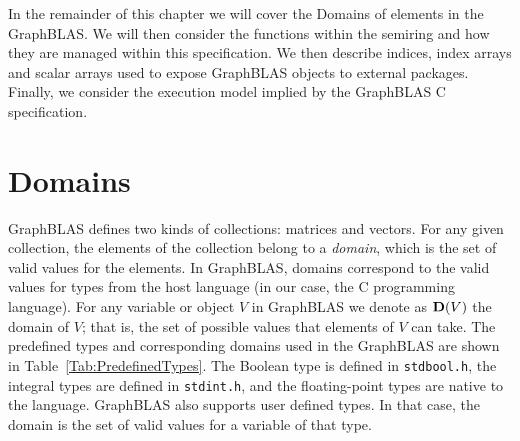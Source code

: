 In the remainder of this chapter we will cover the Domains of 
elements in the GraphBLAS.  We will then consider the functions
within the semiring and how they are managed within this specification.
We then describe indices, index arrays and scalar arrays used
to expose GraphBLAS objects to external packages.  Finally, we consider 
the execution model implied by the GraphBLAS C specification.

\section{Domains}

GraphBLAS defines two kinds of collections: matrices and vectors.
For any given collection, the elements of the collection belong to
a \emph{domain}, which is the set of valid values for the elements.
In GraphBLAS, domains correspond to the valid values for types from
the host language (in our case, the C programming language).  For any
variable or object $V$ in GraphBLAS we denote as $\bold{D}(V)$ the
domain of $V$; that is, the set of possible values that elements of
$V$ can take.  The predefined types and corresponding domains used in the 
GraphBLAS are shown in Table~\ref{Tab:PredefinedTypes}.  The Boolean
type is defined in {\tt stdbool.h}, the integral types are defined in
{\tt stdint.h}, and the floating-point types are native to the language.
GraphBLAS also supports user defined types. In that case, the domain is
the set of valid values for a variable of that type.

